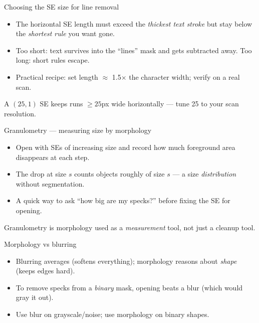 \documentclass[10pt,aspectratio=169]{beamer}
\begin{document}
\begin{frame}{Choosing the SE size for line removal}
  \begin{itemize}
    \item The horizontal SE length must exceed the \emph{thickest text stroke} but stay below the \emph{shortest rule} you want gone.
    \item Too short: text survives into the ``lines'' mask and gets subtracted away. Too long: short rules escape.
    \item Practical recipe: set length $\approx$ 1.5$\times$ the character width; verify on a real scan.
  \end{itemize}
  \begin{mathbox}
    A $(25,1)$ SE keeps runs $\ge 25$px wide horizontally — tune 25 to your scan resolution.
  \end{mathbox}
\end{frame}

\begin{frame}{Granulometry — measuring size by morphology}
  \begin{itemize}
    \item Open with SEs of increasing size and record how much foreground area disappears at each step.
    \item The drop at size $s$ counts objects roughly of size $s$ — a size \emph{distribution} without segmentation.
    \item A quick way to ask ``how big are my specks?'' before fixing the SE for opening.
  \end{itemize}
  \begin{infobox}
    Granulometry is morphology used as a \emph{measurement} tool, not just a cleanup tool.
  \end{infobox}
\end{frame}

\begin{frame}{Morphology vs blurring}
  \begin{itemize}
    \item Blurring averages (softens everything); morphology reasons about \emph{shape} (keeps edges hard).
    \item To remove specks from a \emph{binary} mask, opening beats a blur (which would gray it out).
    \item Use blur on grayscale/noise; use morphology on binary shapes.
  \end{itemize}
\end{frame}
\end{document}
